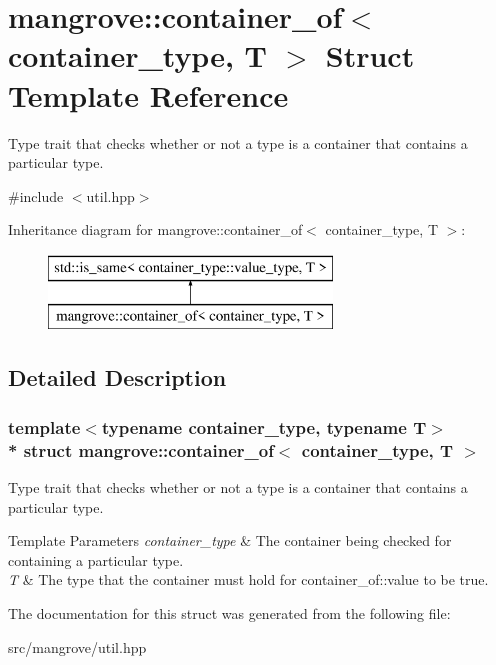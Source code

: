 \hypertarget{structmangrove_1_1container__of}{}\section{mangrove\+:\+:container\+\_\+of$<$ container\+\_\+type, T $>$ Struct Template Reference}
\label{structmangrove_1_1container__of}


Type trait that checks whether or not a type is a container that contains a particular type.  




{\ttfamily \#include $<$util.\+hpp$>$}

Inheritance diagram for mangrove\+:\+:container\+\_\+of$<$ container\+\_\+type, T $>$\+:\begin{figure}[H]
\begin{center}
\leavevmode
\includegraphics[height=2.000000cm]{structmangrove_1_1container__of}
\end{center}
\end{figure}


\subsection{Detailed Description}
\subsubsection*{template$<$typename container\+\_\+type, typename T$>$\\*
struct mangrove\+::container\+\_\+of$<$ container\+\_\+type, T $>$}

Type trait that checks whether or not a type is a container that contains a particular type. 


\begin{DoxyTemplParams}{Template Parameters}
{\em container\+\_\+type} & The container being checked for containing a particular type. \\
\hline
{\em T} & The type that the container must hold for container\+\_\+of\+::value to be true. \\
\hline
\end{DoxyTemplParams}


The documentation for this struct was generated from the following file\+:\begin{DoxyCompactItemize}
\item 
src/mangrove/util.\+hpp\end{DoxyCompactItemize}
